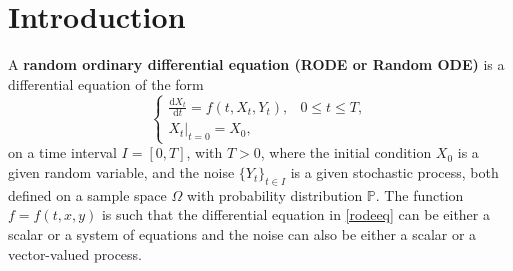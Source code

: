 \documentclass[reqno,12pt]{amsart}
\theoremstyle{plain} %
\theoremstyle{definition} %
\begin{document}
\begin{abstract}
    It is well known that the Euler method for a random ordinary differential equation $\mathrm{d}X_t/\mathrm{d}t = f(t, X_t, Y_t)$ driven by a stochastic process $\{Y_t\}_t$ with $\theta$-H\"older sample paths is estimated to be of strong order $\theta$ with respect to the time step, provided $f=f(t, x, y)$ is sufficiently regular and with suitable bounds. This order is known to increase to $1$ in some special cases. Here, it is proved that, in many more typical cases, further structures on the noise can be exploited so that the strong convergence is of order 1. In fact, we prove so for any semi-martingale noise. This includes It\^o diffusion processes, point-process noises, transport-type processes with sample paths of bounded variation, and time-changed Brownian motion. The result follows from estimating the global error as an iterated integral over both large and small mesh scales, and by switching the order of integration to move the critical regularity to the large scale. The work is complemented with numerical simulations showing the optimality of the strong order 1 convergence in those cases, and with an example with fractional Brownian motion noise with Hurst parameter $0 < H < 1/2,$ which is not a semi-martingale and for which the order of convergence is $H + 1/2$, hence lower than the attained order 1 in the semi-martingale case, but still higher than the order $H$ of convergence expected from previous works.
\end{abstract}

\maketitle

\tableofcontents

\section{Introduction}
\label{secintro}

A \textbf{random ordinary differential equation (RODE or Random ODE)} is a differential equation of the form
\begin{equation}
  \label{rodeeq}
  \begin{cases}
    \displaystyle \frac{\mathrm{d}X_t}{\mathrm{d} t} = f(t, X_t, Y_t), & 0 \leq t \leq T, \\
    \left. X_t \right|_{t = 0} = X_0,
  \end{cases}
\end{equation}
on a time interval $I=[0, T]$, with $T > 0$, where the initial condition $X_0$ is a given random variable, and the noise $\{Y_t\}_{t\in I}$ is a given stochastic process, both defined on a sample space $\Omega$ with probability distribution $\mathbb{P}.$ The function $f=f(t, x, y)$ is such that the differential equation in \cref{rodeeq} can be either a scalar or a system of equations and the noise can also be either a scalar or a vector-valued process.
\end{document}

